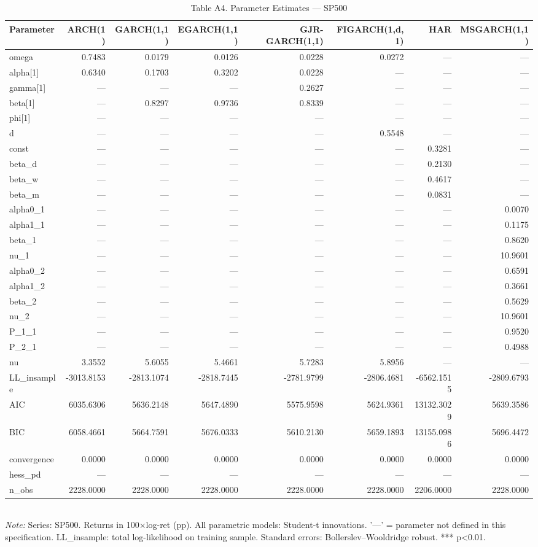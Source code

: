 \begin{table}[ht]
\centering
\caption{Table A4. Parameter Estimates — SP500}
\label{tab:est_sp500}
\begin{tabular}{lrrrrrrr}
\toprule
Parameter & ARCH(1) & GARCH(1,1) & EGARCH(1,1) & GJR-GARCH(1,1) & FIGARCH(1,d,1) & HAR & MSGARCH(1,1) \\
\midrule
omega & 0.7483 & 0.0179 & 0.0126 & 0.0228 & 0.0272 & — & — \\
alpha[1] & 0.6340 & 0.1703 & 0.3202 & 0.0228 & — & — & — \\
gamma[1] & — & — & — & 0.2627 & — & — & — \\
beta[1] & — & 0.8297 & 0.9736 & 0.8339 & — & — & — \\
phi[1] & — & — & — & — & — & — & — \\
d & — & — & — & — & 0.5548 & — & — \\
const & — & — & — & — & — & 0.3281 & — \\
beta_d & — & — & — & — & — & 0.2130 & — \\
beta_w & — & — & — & — & — & 0.4617 & — \\
beta_m & — & — & — & — & — & 0.0831 & — \\
alpha0_1 & — & — & — & — & — & — & 0.0070 \\
alpha1_1 & — & — & — & — & — & — & 0.1175 \\
beta_1 & — & — & — & — & — & — & 0.8620 \\
nu_1 & — & — & — & — & — & — & 10.9601 \\
alpha0_2 & — & — & — & — & — & — & 0.6591 \\
alpha1_2 & — & — & — & — & — & — & 0.3661 \\
beta_2 & — & — & — & — & — & — & 0.5629 \\
nu_2 & — & — & — & — & — & — & 10.9601 \\
P_1_1 & — & — & — & — & — & — & 0.9520 \\
P_2_1 & — & — & — & — & — & — & 0.4988 \\
nu & 3.3552 & 5.6055 & 5.4661 & 5.7283 & 5.8956 & — & — \\
LL_insample & -3013.8153 & -2813.1074 & -2818.7445 & -2781.9799 & -2806.4681 & -6562.1515 & -2809.6793 \\
AIC & 6035.6306 & 5636.2148 & 5647.4890 & 5575.9598 & 5624.9361 & 13132.3029 & 5639.3586 \\
BIC & 6058.4661 & 5664.7591 & 5676.0333 & 5610.2130 & 5659.1893 & 13155.0986 & 5696.4472 \\
convergence & 0.0000 & 0.0000 & 0.0000 & 0.0000 & 0.0000 & 0.0000 & 0.0000 \\
hess_pd & — & — & — & — & — & — & — \\
n_obs & 2228.0000 & 2228.0000 & 2228.0000 & 2228.0000 & 2228.0000 & 2206.0000 & 2228.0000 \\
\bottomrule
\end{tabular}
\\[3pt]\footnotesize\textit{Note:} Series: SP500. Returns in 100×log-ret (pp). All parametric models: Student-t innovations. '—' = parameter not defined in this specification. LL_insample: total log-likelihood on training sample. Standard errors: Bollerslev–Wooldridge robust. *** p<0.01.
\end{table}